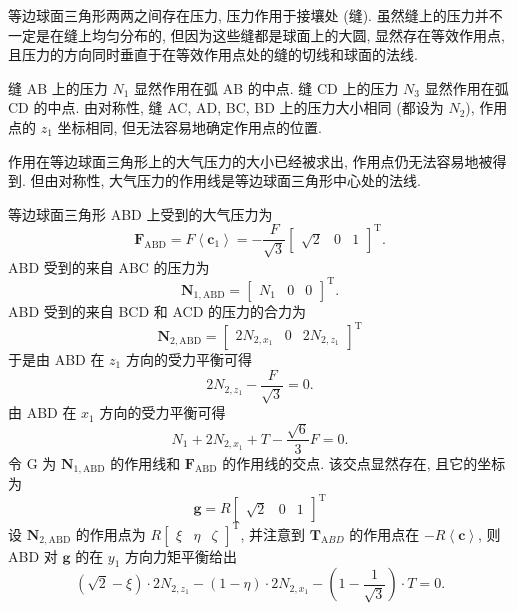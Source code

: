 \documentclass{article}
\begin{document}
等边球面三角形两两之间存在压力, 压力作用于接壤处 (缝).
虽然缝上的压力并不一定是在缝上均匀分布的, 但因为这些缝都是球面上的大圆, 显然存在等效作用点,
且压力的方向同时垂直于在等效作用点处的缝的切线和球面的法线.

缝 AB 上的压力 $N_1$ 显然作用在弧 AB 的中点.
缝 CD 上的压力 $N_3$ 显然作用在弧 CD 的中点.
由对称性, 缝 AC, AD, BC, BD 上的压力大小相同 (都设为 $N_2$), 作用点的 $z_1$ 坐标相同,
但无法容易地确定作用点的位置.

作用在等边球面三角形上的大气压力的大小已经被求出, 作用点仍无法容易地被得到.
但由对称性, 大气压力的作用线是等边球面三角形中心处的法线.

等边球面三角形 ABD 上受到的大气压力为
\begin{equation}
	\mathbf F_{\mathrm{ABD}}=F\left<\mathbf c_1\right>=
	-\frac F{\sqrt3}\left[\begin{matrix}\sqrt2 & 0 & 1\end{matrix}\right]^\mathrm T.
\end{equation}
ABD 受到的来自 ABC 的压力为
\begin{equation}
	\mathbf N_{1,\mathrm{ABD}}=\left[\begin{matrix}N_1 & 0 & 0\end{matrix}\right]^\mathrm T.
\end{equation}
ABD 受到的来自 BCD 和 ACD 的压力的合力为
\begin{equation}
	\mathbf N_{2,\mathrm{ABD}}=\left[\begin{matrix}2N_{2,x_1} & 0 & 2N_{2,z_1}\end{matrix}\right]^\mathrm T
\end{equation}
于是由 ABD 在 $z_1$ 方向的受力平衡可得
\begin{equation}
	2N_{2,z_1}-\frac F{\sqrt3}=0.
	\label{eq:z1受力平衡}
\end{equation}
由 ABD 在 $x_1$ 方向的受力平衡可得
\begin{equation}
	N_1+2N_{2,x_1}+T-\frac{\sqrt6}3F=0.
	\label{eq:x1受力平衡}
\end{equation}
令 G 为 $\mathbf N_{1,\mathrm{ABD}}$ 的作用线和 $\mathbf F_{\mathrm{ABD}}$ 的作用线的交点.
该交点显然存在, 且它的坐标为
\begin{equation}
	\mathbf g=R\left[\begin{matrix}\sqrt2 & 0 & 1\end{matrix}\right]^\mathrm T
\end{equation}
设 $\mathbf N_{2,\mathrm{ABD}}$ 的作用点为
$R\left[\begin{matrix}\xi & \eta & \zeta\end{matrix}\right]^\mathrm T$,
并注意到 $\mathbf T_{\mathrm ABD}$ 的作用点在 $-R\left<\mathbf c\right>$,
则 ABD 对 $\mathbf g$ 的在 $y_1$ 方向力矩平衡给出
\begin{equation}
	\left(\sqrt2-\xi\right)\cdot2N_{2,z_1}-\left(1-\eta\right)\cdot2N_{2,x_1}-\left(1-\frac1{\sqrt3}\right)\cdot T=0.
	\label{eq:y1受力矩平衡}
\end{equation}
\end{document}
